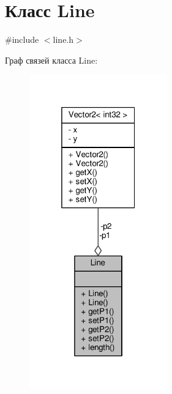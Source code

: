 \hypertarget{class_line}{}\section{Класс Line}
\label{class_line}


{\ttfamily \#include $<$line.\+h$>$}



Граф связей класса Line\+:
\nopagebreak
\begin{figure}[H]
\begin{center}
\leavevmode
\includegraphics[width=169pt]{da/d45/class_line__coll__graph}
\end{center}
\end{figure}
